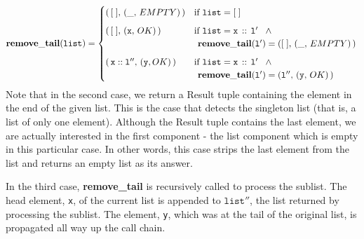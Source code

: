 \documentclass[10pt]{article}
\begin{document}
    \[
    \mathtt{\mathbf{remove\_tail}(list)} = \begin{cases}
        (\, [\;], \, (\_, \,EMPTY)\,) & \mbox{if } \mathtt{list} = [\;]\vspace*{6pt}\\
        (\, [\;], \, (\mathtt{x}, \, OK)\,) & \mbox{if } \mathtt{list = x\,::\,l'} \;\; \; \wedge\\
                                                & \hspace*{4pt}\mathtt{\mathbf{remove\_tail}(l')} = ([\;], \,(\_, \,EMPTY)\,)\vspace*{6pt}\\
        (\, \mathtt{x::l''}, \, (\mathtt{y}, OK)\,) & \mbox{if } \mathtt{list = x\,::\,l'} \; \; \; \wedge\\
                                                   & \hspace*{4pt}\mathtt{\mathbf{remove\_tail}(l')} = (\mathtt{l''}, \,(\mathtt{y},\, OK)\,)
    \end{cases}\vspace*{2pt}\\
    \]
  \noindent Note that in the second case, we return a Result tuple containing the element in the end of the given list. This is the case that detects the singleton list (that is, a list of only one element). Although the Result tuple contains the last element, we are actually interested in the first component - the list component which is empty in this particular case. In other words, this case strips the last element from the list and returns an empty list as its answer.

  In the third case, \textbf{remove\_tail} is recursively called to process the sublist. The head element, \texttt{x}, of the current list is appended to $\mathtt{list''}$, the list returned by processing the sublist. The element, \texttt{y}, which was at the tail of the original list, is propagated all way up the call chain. 
\end{document}
